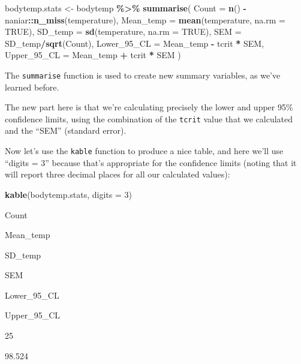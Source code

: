 \documentclass[
]{book}
\newenvironment{Shaded}{\begin{snugshade}}{\end{snugshade}}
\newcommand{\AttributeTok}[1]{\textcolor[rgb]{0.13,0.29,0.53}{#1}}
\newcommand{\ConstantTok}[1]{\textcolor[rgb]{0.56,0.35,0.01}{#1}}
\newcommand{\DecValTok}[1]{\textcolor[rgb]{0.00,0.00,0.81}{#1}}
\newcommand{\FunctionTok}[1]{\textcolor[rgb]{0.13,0.29,0.53}{\textbf{#1}}}
\newcommand{\NormalTok}[1]{#1}
\newcommand{\OtherTok}[1]{\textcolor[rgb]{0.56,0.35,0.01}{#1}}
\newcommand{\SpecialCharTok}[1]{\textcolor[rgb]{0.81,0.36,0.00}{\textbf{#1}}}
\begin{document}
\begin{Shaded}
\begin{Highlighting}[]
\NormalTok{bodytemp.stats }\OtherTok{\textless{}{-}}\NormalTok{ bodytemp }\SpecialCharTok{\%\textgreater{}\%}
  \FunctionTok{summarise}\NormalTok{(}
    \AttributeTok{Count =} \FunctionTok{n}\NormalTok{() }\SpecialCharTok{{-}}\NormalTok{ naniar}\SpecialCharTok{::}\FunctionTok{n\_miss}\NormalTok{(temperature),}
    \AttributeTok{Mean\_temp =} \FunctionTok{mean}\NormalTok{(temperature, }\AttributeTok{na.rm =} \ConstantTok{TRUE}\NormalTok{),}
    \AttributeTok{SD\_temp =} \FunctionTok{sd}\NormalTok{(temperature, }\AttributeTok{na.rm =} \ConstantTok{TRUE}\NormalTok{),}
    \AttributeTok{SEM =}\NormalTok{ SD\_temp}\SpecialCharTok{/}\FunctionTok{sqrt}\NormalTok{(Count),}
    \AttributeTok{Lower\_95\_CL =}\NormalTok{ Mean\_temp }\SpecialCharTok{{-}}\NormalTok{ tcrit }\SpecialCharTok{*}\NormalTok{ SEM,}
    \AttributeTok{Upper\_95\_CL =}\NormalTok{ Mean\_temp }\SpecialCharTok{+}\NormalTok{ tcrit }\SpecialCharTok{*}\NormalTok{ SEM}
\NormalTok{  )}
\end{Highlighting}
\end{Shaded}

The \texttt{summarise} function is used to create new summary variables, as we've learned before.

The new part here is that we're calculating precisely the lower and upper 95\% confidence limits, using the combination of the \texttt{tcrit} value that we calculated and the ``SEM'' (standard error).

Now let's use the \texttt{kable} function to produce a nice table, and here we'll use ``digits = 3'' because that's appropriate for the confidence limits (noting that it will report three decimal places for all our calculated values):

\begin{Shaded}
\begin{Highlighting}[]
\FunctionTok{kable}\NormalTok{(bodytemp.stats, }\AttributeTok{digits =} \DecValTok{3}\NormalTok{)}
\end{Highlighting}
\end{Shaded}

Count

Mean\_temp

SD\_temp

SEM

Lower\_95\_CL

Upper\_95\_CL

25

98.524
\end{document}
